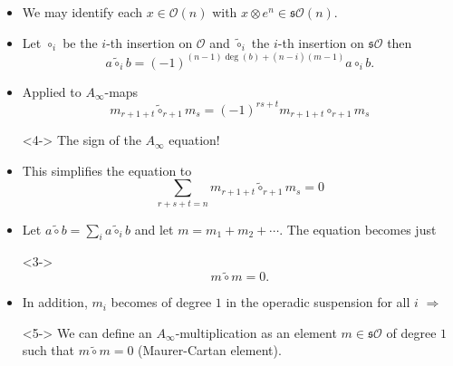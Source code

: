 \documentclass{beamer}
\theoremstyle{definition}
\begin{document}
\begin{frame}
\begin{itemize}

\item<1-> We may identify each $x\in\mathcal{O}(n)$ with $x\otimes e^n\in \mathfrak{s}\mathcal{O}(n)$.
\item<2-> Let $\circ_i$ be the $i$-th insertion on $\mathcal{O}$ and $\tilde{\circ}_i$ the $i$-th insertion on $\mathfrak{s}\mathcal{O}$ then
\[a\tilde{\circ}_ib=(-1)^{(n-1)\deg(b)+(n-i)(m-1)}a\circ_i b.\]
\item<3-> Applied to  $A_\infty$-maps 
\[m_{r+1+t}\tilde{\circ}_{r+1}m_s=(-1)^{rs+t}m_{r+1+t}\circ_{r+1}m_s\]
\item[]<4-> The sign of the $A_\infty$ equation!
\end{itemize}
\end{frame}



\begin{frame}
\begin{itemize}
\item<1-> This simplifies the equation to
\[\sum_{r+s+t=n}m_{r+1+t}\tilde{\circ}_{r+1}m_s=0\] %
\item<2-> Let $a\tilde{\circ}b=\sum_{i}a\tilde{\circ}_ib$ and let $m=m_1+m_2+\cdots$. The equation becomes just
\item[]<3-> \[m\tilde{\circ}m=0.\]
\item<4-> In addition, $m_i$ becomes of degree $1$ in the operadic suspension for all $i$ $\Rightarrow$
\item[]<5-> We can define an $A_\infty$-multiplication as an element $m\in\mathfrak{s}\mathcal{O}$ of degree $1$ such that $m\tilde{\circ}m=0$ (Maurer-Cartan element). 
\end{itemize}
\end{frame}
\end{document}
